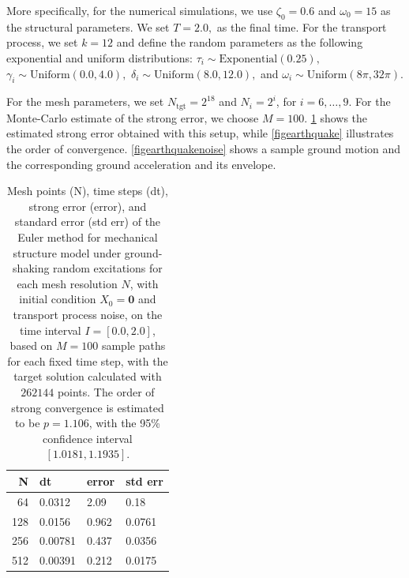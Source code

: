 \documentclass[reqno,12pt]{amsart}
\theoremstyle{plain} %
\theoremstyle{definition} %
\begin{document}
More specifically, for the numerical simulations, we use $\zeta_0 = 0.6$ and $\omega_0 = 15$ as the structural parameters. We set $T = 2.0,$ as the final time. For the transport process, we set $k=12$ and define the random parameters as the following exponential and uniform distributions: $\tau_i \sim \textrm{Exponential}(0.25),$ $\gamma_i \sim \textrm{Uniform}(0.0, 4.0),$ $\delta_i \sim \textrm{Uniform}(8.0, 12.0),$ and $\omega_i \sim \textrm{Uniform}(8\pi, 32\pi).$

For the mesh parameters, we set $N_{\textrm{tgt}} = 2^{18}$ and $N_i = 2^i$, for $i=6, \ldots, 9$. For the Monte-Carlo estimate of the strong error, we choose $M = 100.$ \cref{tableearthquake} shows the estimated strong error obtained with this setup, while \cref{figearthquake} illustrates the order of convergence. \cref{figearthquakenoise} shows a sample ground motion and the corresponding ground acceleration and its envelope.

\begin{table}
    \begin{tabular}[htb]{|r|l|l|l|}
        \hline N & dt & error & std err \\
        \hline \hline
        64 & 0.0312 & 2.09 & 0.18 \\
        128 & 0.0156 & 0.962 & 0.0761 \\
        256 & 0.00781 & 0.437 & 0.0356 \\
        512 & 0.00391 & 0.212 & 0.0175 \\
        \hline
    \end{tabular}
    \bigskip

    \caption{Mesh points (N), time steps (dt), strong error (error), and standard error (std err) of the Euler method for mechanical structure model under ground-shaking random excitations for each mesh resolution $N$, with initial condition $X_0 = \mathbf{0}$ and transport process noise, on the time interval $I = [0.0, 2.0]$, based on $M = 100$ sample paths for each fixed time step, with the target solution calculated with $262144$ points. The order of strong convergence is estimated to be $p = 1.106$, with the 95\% confidence interval $[1.0181, 1.1935]$.}
    \label{tableearthquake}
\end{table}
\end{document}
